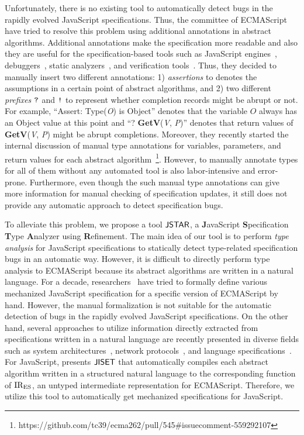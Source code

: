 Unfortunately, there is no existing tool to automatically detect bugs in the
rapidly evolved JavaScript specifications.  Thus, the committee of ECMAScript
have tried to resolve this problem using additional annotations in abstract
algorithms.  Additional annotations make the specification more readable and
also they are useful for the specification-based tools such as JavaScript
engines~\cite{v8, graaljs, qjs, moddable}, debuggers~\cite{jsexplain}, static
analyzers~\cite{safe, tajs, jsai, wala}, and verification tools~\cite{javert}.
Thus, they decided to manually insert two different annotations: 1)
\textit{assertions} to denotes the assumptions in a certain point of abstract
algorithms, and 2) two different \textit{prefixes} $\texttt{?}$ and $\texttt{!}$ to
represent whether completion records might be abrupt or not.  For example,
``Assert: Type(\textit{O}) is Object'' denotes that the variable $\textit{O}$
always has an Object value at this point and ``? \textbf{GetV}(\textit{V},
\textit{P})'' denotes that return values of \textbf{GetV}(\textit{V},
\textit{P}) might be abrupt completions.  Moreover, they recently started the
internal discussion of manual type annotations for variables, parameters, and
return values for each abstract
algorithm~\footnote{https://github.com/tc39/ecma262/pull/545\#issuecomment-559292107}.
However, to manually annotate types for all of them without any automated tool
is also labor-intensive and error-prone.  Furthermore, even though the such
manual type annotations can give more information for manual checking of
specification updates, it still does not provide any automatic approach to
detect specification bugs.

To alleviate this problem, we propose a tool $\textsf{JSTAR}$, a \textbf{J}avaScript
\textbf{S}pecification \textbf{T}ype \textbf{A}nalyzer using
\textbf{R}efinement.  The main idea of our tool is to perform \textit{type
analysis} for JavaScript specifications to statically detect type-related
specification bugs in an automatic way.  However, it is difficult to directly
perform type analysis to ECMAScript because its abstract algorithms are written
in a natural language.  For a decade, researchers~\cite{lambdajs, jscert, kjs}
have tried to formally define various mechanized JavaScript specification for a
specific version of ECMAScript by hand.  However, the manual formalization is
not suitable for the automatic detection of bugs in the rapidly evolved
JavaScript specifications.  On the other hand, several approaches to utilize
information directly extracted from specifications written in a natural language
are recently presented in diverse fields such as system architectures~\cite{x86,
arm}, network protocols~\cite{basespec}, and language
specifications~\cite{spectest}.  For JavaScript, \citet{jiset} presents $\textsf{JISET}$
that automatically compiles each abstract algorithm written in a structured
natural language to the corresponding function of ${\text{IR}_\text{ES}}$, an untyped
intermediate representation for ECMAScript.  Therefore, we utilize this tool to
automatically get mechanized specifications for JavaScript.


